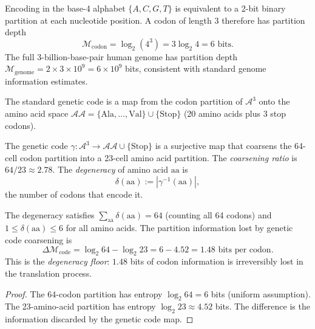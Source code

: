 \begin{remark}
\label{rem:ch02-base4}
Encoding in the base-4 alphabet $\{A, C, G, T\}$ is equivalent to a 2-bit
binary partition at each nucleotide position.  A codon of length 3 therefore
has partition depth
\[
  \mathcal{M}_{\mathrm{codon}}
  = \log_2(4^3) = 3 \log_2 4 = 6 \text{ bits.}
\]
The full 3-billion-base-pair human genome has partition depth
$\mathcal{M}_{\mathrm{genome}} = 2 \times 3 \times 10^9 = 6 \times 10^9$ bits,
consistent with standard genome information estimates.
\end{remark}

The standard genetic code is a map from the codon partition of $\mathcal{A}^3$
onto the amino acid space $\mathcal{AA} = \{\text{Ala}, \ldots, \text{Val}\}
\cup \{\mathrm{Stop}\}$ (20 amino acids plus 3 stop codons).

\begin{definition}
\label{def:ch02-genetic-coarsening}
The genetic code $\gamma: \mathcal{A}^3 \to \mathcal{AA} \cup \{\mathrm{Stop}\}$
is a surjective map that coarsens the 64-cell codon partition into a 23-cell
amino acid partition.  The \emph{coarsening ratio} is $64/23 \approx 2.78$.
The \emph{degeneracy} of amino acid $\mathrm{aa}$ is
\[
  \delta(\mathrm{aa}) := |\gamma^{-1}(\mathrm{aa})|,
\]
the number of codons that encode it.
\end{definition}

\begin{proposition}
\label{prop:ch02-degeneracy}
The degeneracy satisfies $\sum_{\mathrm{aa}} \delta(\mathrm{aa}) = 64$ (counting
all 64 codons) and $1 \leq \delta(\mathrm{aa}) \leq 6$ for all amino acids.  The
partition information lost by genetic code coarsening is
\[
  \Delta \mathcal{M}_{\mathrm{code}}
  = \log_2 64 - \log_2 23
  = 6 - 4.52
  = 1.48 \text{ bits per codon.}
\]
This is the \emph{degeneracy floor}: $1.48$ bits of codon information is
irreversibly lost in the translation process.
\end{proposition}

\begin{proof}
The 64-codon partition has entropy $\log_2 64 = 6$ bits (uniform assumption).
The 23-amino-acid partition has entropy $\log_2 23 \approx 4.52$ bits.  The
difference is the information discarded by the genetic code map.
\end{proof}

